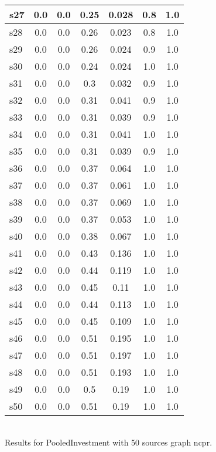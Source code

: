 \documentclass{article}
\begin{document}
\begin{tabular}{|l|c|c|c|c|c|c|}
\hline
s27 &0.0 & 0.0 & 0.25 & 0.028 & 0.8 & 1.0\\
\hline
s28 &0.0 & 0.0 & 0.26 & 0.023 & 0.8 & 1.0\\
\hline
s29 &0.0 & 0.0 & 0.26 & 0.024 & 0.9 & 1.0\\
\hline
s30 &0.0 & 0.0 & 0.24 & 0.024 & 1.0 & 1.0\\
\hline
s31 &0.0 & 0.0 & 0.3 & 0.032 & 0.9 & 1.0\\
\hline
s32 &0.0 & 0.0 & 0.31 & 0.041 & 0.9 & 1.0\\
\hline
s33 &0.0 & 0.0 & 0.31 & 0.039 & 0.9 & 1.0\\
\hline
s34 &0.0 & 0.0 & 0.31 & 0.041 & 1.0 & 1.0\\
\hline
s35 &0.0 & 0.0 & 0.31 & 0.039 & 0.9 & 1.0\\
\hline
s36 &0.0 & 0.0 & 0.37 & 0.064 & 1.0 & 1.0\\
\hline
s37 &0.0 & 0.0 & 0.37 & 0.061 & 1.0 & 1.0\\
\hline
s38 &0.0 & 0.0 & 0.37 & 0.069 & 1.0 & 1.0\\
\hline
s39 &0.0 & 0.0 & 0.37 & 0.053 & 1.0 & 1.0\\
\hline
s40 &0.0 & 0.0 & 0.38 & 0.067 & 1.0 & 1.0\\
\hline
s41 &0.0 & 0.0 & 0.43 & 0.136 & 1.0 & 1.0\\
\hline
s42 &0.0 & 0.0 & 0.44 & 0.119 & 1.0 & 1.0\\
\hline
s43 &0.0 & 0.0 & 0.45 & 0.11 & 1.0 & 1.0\\
\hline
s44 &0.0 & 0.0 & 0.44 & 0.113 & 1.0 & 1.0\\
\hline
s45 &0.0 & 0.0 & 0.45 & 0.109 & 1.0 & 1.0\\
\hline
s46 &0.0 & 0.0 & 0.51 & 0.195 & 1.0 & 1.0\\
\hline
s47 &0.0 & 0.0 & 0.51 & 0.197 & 1.0 & 1.0\\
\hline
s48 &0.0 & 0.0 & 0.51 & 0.193 & 1.0 & 1.0\\
\hline
s49 &0.0 & 0.0 & 0.5 & 0.19 & 1.0 & 1.0\\
\hline
s50 &0.0 & 0.0 & 0.51 & 0.19 & 1.0 & 1.0\\
\hline
\end{tabular}\\

\noindent Results for PooledInvestment with 50 sources graph ncpr.
\end{document}

